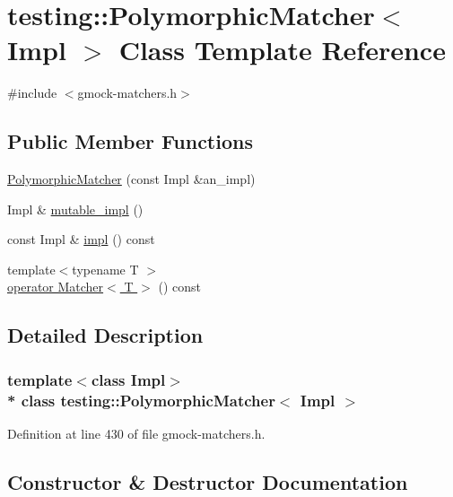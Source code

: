 \hypertarget{classtesting_1_1_polymorphic_matcher}{}\section{testing\+:\+:Polymorphic\+Matcher$<$ Impl $>$ Class Template Reference}
\label{classtesting_1_1_polymorphic_matcher}


{\ttfamily \#include $<$gmock-\/matchers.\+h$>$}

\subsection*{Public Member Functions}
\begin{DoxyCompactItemize}
\item 
\hyperlink{classtesting_1_1_polymorphic_matcher_a04c23972b2dcc6e036b00006d7689712}{Polymorphic\+Matcher} (const Impl \&an\+\_\+impl)
\item 
Impl \& \hyperlink{classtesting_1_1_polymorphic_matcher_a3b7227b1f5c203efd47d393b781b317c}{mutable\+\_\+impl} ()
\item 
const Impl \& \hyperlink{classtesting_1_1_polymorphic_matcher_af667291ff018c21309b1222727fe4d1e}{impl} () const 
\item 
{\footnotesize template$<$typename T $>$ }\\\hyperlink{classtesting_1_1_polymorphic_matcher_a32d881a7f5cef1b25b447bbac199e042}{operator Matcher$<$ T $>$} () const 
\end{DoxyCompactItemize}


\subsection{Detailed Description}
\subsubsection*{template$<$class Impl$>$\\*
class testing\+::\+Polymorphic\+Matcher$<$ Impl $>$}



Definition at line 430 of file gmock-\/matchers.\+h.



\subsection{Constructor \& Destructor Documentation}
